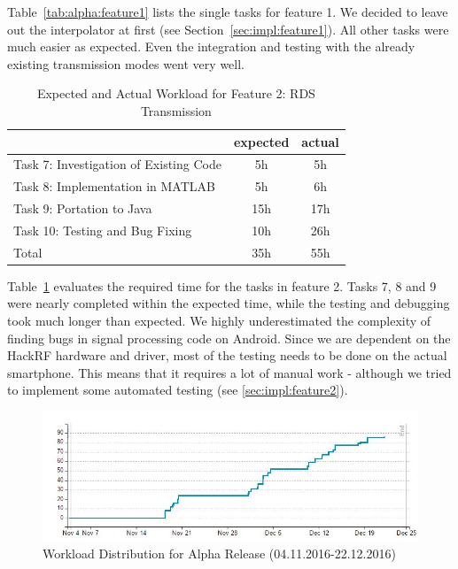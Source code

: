 Table~\ref{tab:alpha:feature1} lists the single tasks for feature 1. We decided to leave out the interpolator at first (see Section~\ref{sec:impl:feature1}). All other tasks were much easier as expected. Even the integration and testing with the already existing transmission modes went very well. 
	
	\begin{table}[!htbp]
		\centering
		\caption{Expected and Actual Workload for Feature 2: RDS Transmission}				\label{tab:alpha:feature2}
		\begin{tabular}{ l | c | c }
			& expected  & actual \\ \hline
			Task 7: Investigation of Existing Code&  5h & 5h \\ \hline
			Task 8: Implementation in MATLAB & 5h & 6h  \\ \hline
			Task 9: Portation to Java & 15h & 17h  \\ \hline
			Task 10: Testing and Bug Fixing & 10h & 26h \\ \hline \hline
			Total & 35h & 55h
		\end{tabular}
	\end{table}
	
	Table~\ref{tab:alpha:feature2} evaluates the required time for the tasks in feature 2. Tasks 7, 8 and 9 were nearly completed within the expected time, while the testing and debugging took much longer than expected. We highly underestimated the complexity of finding bugs in signal processing code on Android. Since we are dependent on the HackRF hardware and driver, most of the testing needs to be done on the actual smartphone. This means that it requires a lot of manual work - although we tried to implement some automated testing (see \ref{sec:impl:feature2}). 
	
	\begin{figure}[!htbp]
		\centering
		\includegraphics[width=1\linewidth]{gfx/Agilefant_Alpha.jpg}
		\caption{Workload Distribution for Alpha Release (04.11.2016-22.12.2016)}
		\label{fig:agilefant_alpha}
	\end{figure}
	
